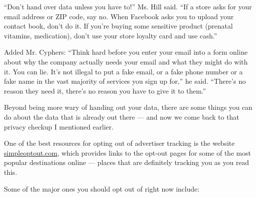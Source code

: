 ``Don't hand over data unless you have to!'' Ms. Hill said. ``If a store
asks for your email address or ZIP code, say no. When Facebook asks you
to upload your contact book, don't do it. If you're buying some
sensitive product (prenatal vitamins, medication), don't use your store
loyalty card and use cash.''

Added Mr. Cyphers: ``Think hard before you enter your email into a form
online about why the company actually needs your email and what they
might do with it. You can lie. It's not illegal to put a fake email, or
a fake phone number or a fake name in the vast majority of services you
sign up for,'' he said. ``There's no reason they need it, there's no
reason you have to give it to them.''

Beyond being more wary of handing out your data, there are some things
you can do about the data that is already out there --- and now we come
back to that privacy checkup I mentioned earlier.

One of the best resources for opting out of advertiser tracking is the
website \href{https://simpleoptout.com/}{simpleoptout.com}, which
provides links to the opt-out pages for some of the most popular
destinations online --- places that are definitely tracking you as you
read this.

Some of the major ones you should opt out of right now include:

